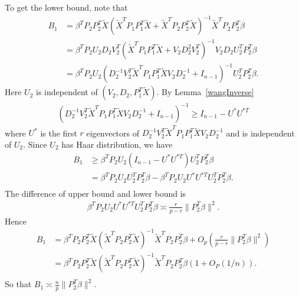 \documentclass[review]{elsarticle}
\theoremstyle{plain}
\theoremstyle{definition}
\theoremstyle{remark}
\begin{document}
To get the lower bound, note that
\begin{equation*}
    \begin{aligned}
        B_1&= \beta^T P_2 P_2^T \tilde{X} {(\tilde{X}^T P_1 P_1^T \tilde{X}+\tilde{X}^T P_2 P_2^T \tilde{X})}^{-1}\tilde{X}^T P_2 P_2^T \beta\\
        &= \beta^T P_2 U_2 D_2 V^T_2 {(\tilde{X}^T P_1 P_1^T \tilde{X}+V_2 D_2^2 V_2^T)}^{-1}V_2 D_2 U_2^T P_2^T \beta\\
        &= \beta^T P_2 U_2  {(D_2^{-1} V_2^T \tilde{X}^T P_1 P_1^T \tilde{X} V_2 D_2^{-1} +I_{n-1})}^{-1} U_2^T P_2^T \beta.
    \end{aligned}
\end{equation*}
Here $U_2$ is independent of $(V_2,D_2,P_1^T\tilde{X})$. By Lemma~\ref{wangInverse}
\begin{equation*}
    \begin{aligned}
        {(D_2^{-1}V_2^T\tilde{X}^T P_1 P_1^T \tilde{X}V_2 D_2^{-1} +I_{n-1})}^{-1}\geq I_{n-1}- U^* U^{*T}
    \end{aligned}
\end{equation*}
where $U^*$ is the first $r$ eigenvectors of $D_2^{-1} V_2^T \tilde{X}^T P_1 P_1^T \tilde{X}V_2 D_2^{-1}$ and is independent of $U_2$. Since $U_2$ has Haar distribution, we have
\begin{equation}\label{lowerbound}
    \begin{aligned}
        B_1&\geq \beta^T P_2 U_2 (I_{n-1}-U^* U^{*T})U_2^T P_2^T \beta\\
        &= \beta^T P_2 U_2 U_2^T P_2^T \beta-  \beta^T P_2 U_2 U^* U^{*T} U_2^T P_2^T \beta.\\
    \end{aligned}
\end{equation}
The difference of upper bound and lower bound is
\begin{equation*}
    \begin{aligned}
 \beta^T P_2 U_2 U^* U^{*T}U_2^T P_2^T \beta \asymp \frac{r}{p-r}\|P_2^T \beta\|^2.
    \end{aligned}
\end{equation*}
Hence 
\begin{equation*}
    \begin{aligned}
        B_1&=\beta^T P_2 P_2^T \tilde{X} {(\tilde{X}^T P_2 P_2^T \tilde{X})}^{-1}\tilde{X}^T P_2 P_2^T \beta+O_p(\frac{r}{p-r}\|P_2^T \beta\|^2)\\
        &=\beta^T P_2 P_2^T \tilde{X} {(\tilde{X}^T P_2 P_2^T \tilde{X})}^{-1}\tilde{X}^T P_2 P_2^T \beta(1+O_P(1/n)).\\
    \end{aligned}
\end{equation*}
So that $B_1\asymp \frac{n}{p}\|P_2^T \beta\|^2$.
\end{document}

